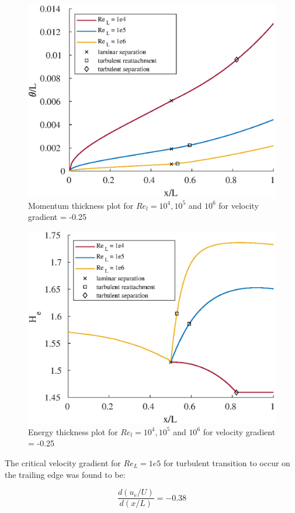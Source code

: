 \begin{figure}[H]
\centering
\includegraphics[scale=0.8]{graphs/e6g3.eps}
\caption{Momentum thickness plot for $Re_l = 10^4, 10^5$ and $10^6$ for velocity gradient = -0.25}
\label{e6g3}
\end{figure}

\begin{figure}[H]
\centering
\includegraphics[scale=0.8]{graphs/e6g4.eps}
\caption{Energy thickness plot for $Re_l = 10^4, 10^5$ and $10^6$ for velocity gradient = -0.25}
\label{e6g4}
\end{figure}

\pagebreak


  
\vspace{0.20cm}
  
  The critical velocity gradient for $Re_L = 1e5$ for turbulent transition to occur on the trailing edge was found to be:
  
  \vspace{0.1cm}
  \[\frac{d(u_e/U)}{d(x/L)} = -0.38\]
  
\pagebreak